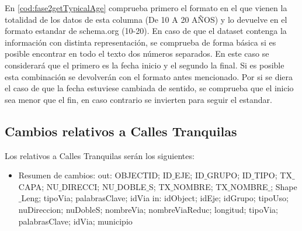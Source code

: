 \begin{itemize}
	
	
	En \ref{cod:fase2getTypicalAge} comprueba primero el formato en el que vienen la totalidad de los datos de esta columna (De 10 A 20 AÑOS) y lo devuelve en el formato estandar de schema.org (10-20). En caso de que el dataset contenga la información con distinta representación, se comprueba de forma básica si es posible encontrar en todo el texto dos números separados. En este caso se considerará que el primero es la fecha inicio y el segundo la final. Si es posible esta combinación se devolverán con el formato antes mencionado.
	\newline
	Por si se diera el caso de que la fecha estuviese cambiada de sentido, se comprueba que el inicio sea menor que el fin, en caso contrario se invierten para seguir el estandar.
    

\clearpage
\subsection{Cambios relativos a Calles Tranquilas}

Los relativos a Calles Tranquilas serán los siguientes:
    
\begin{itemize}
    \item Resumen de cambios:
\newline out: OBJECTID; ID$\_$EJE; ID$\_$GRUPO; ID$\_$TIPO; TX$\_$CAPA; NU$\_$DIRECCI; NU$\_$DOBLE$\_$S; TX$\_$NOMBRE; TX$\_$NOMBRE$\_$; Shape$\_$Leng; tipoVia; palabrasClave; idVia
\newline in: idObject; idEje; idGrupo; tipoUso; nuDireccion; nuDobleS; nombreVia; nombreViaReduc; longitud; tipoVia; palabrasClave; idVia; municipio
    \newline


\end{itemize}
\end{itemize}
